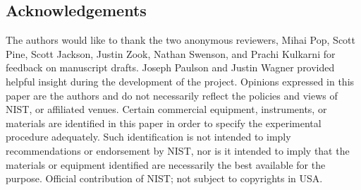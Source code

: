 \documentclass[linenumbers]{bmcart}
\begin{document}
\begin{backmatter}
\subsection*{Acknowledgements}
 The authors would like to thank the two anonymous reviewers, Mihai
Pop, Scott Pine, Scott Jackson, Justin Zook, Nathan Swenson, and Prachi Kulkarni for
feedback on manuscript drafts. Joseph Paulson and Justin Wagner provided
helpful insight during the development of the project.
Opinions expressed in this paper are the
authors and do not necessarily reflect the policies and views of NIST,
or affiliated venues. Certain commercial equipment, instruments, or
materials are identified in this paper in order to specify the
experimental procedure adequately. Such identification is not intended
to imply recommendations or endorsement by NIST, nor is it intended to
imply that the materials or equipment identified are necessarily the
best available for the purpose. Official contribution of NIST; not
subject to copyrights in USA.









\end{backmatter}
\end{document}
